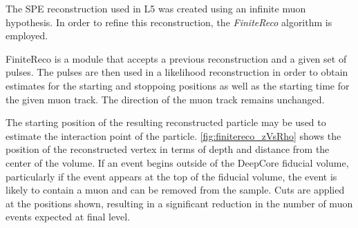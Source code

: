 The SPE reconstruction used in L5 was created using an infinite muon hypothesis. 
In order to refine this reconstruction, the \emph{FiniteReco} algorithm is employed.

FiniteReco is a module that accepts a previous reconstruction and a given set of pulses.
The pulses are then used in a likelihood reconstruction in order to obtain estimates for the starting and stoppoing positions as well as the starting time for the given muon track.
The direction of the muon track remains unchanged.

The starting position of the resulting reconstructed particle may be used to estimate the interaction point of the particle.
\ref{fig:finitereco_zVsRho} shows the position of the reconstructed vertex in terms of depth and distance from the center of the volume.
If an event begins outside of the DeepCore fiducial volume, particularly if the event appears at the top of the fiducial volume, the event is likely to contain a muon and can be removed from the sample.
Cuts are applied at the positions shown, resulting in a significant reduction in the number of muon events expected at final level.

